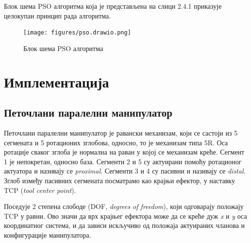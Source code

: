 \documentclass[12pt]{article}
\begin{document}
Блок шема PSO алгоритма која је представљена на слици 2.4.1 приказује целокупан принцип рада алгоритма.

\begin{figure}[H]
    \centering
    \texttt{[image: figures/pso.drawio.png]}
    \caption{Блок шема PSO алгоритма}
    \label{fig:PSO_алгоритам}
\end{figure}
\newpage

\section{Имплементација}

\subsection{Петочлани паралелни манипулатор}
Петочлани паралелни манипулатор је равански механизам, који се састоји из 5 сегмената и 5 ротационих зглобова, односно, то је механизам типа 5R. Оса ротације сваког зглоба је нормална на раван у којој се механизам креће. Сегмент 1 је непокретан, односно база. Сегменти 2 и 5 су актуирани помоћу ротационог актуатора и називају се \textit{proximal}. Сегменти 3 и 4 су пасивни и називају се \textit{distal}. Зглоб између пасивних сегмената посматрамо као крајњи ефектор, у наставку TCP (\textit{tool center point}).

 Поседује 2 степена слободе (DOF, \textit{degrees of freedom}), који одговарају положају TCP у равни. Ово значи да врх крајњег ефектора може да се креће дуж \textit{x} и \textit{y} оса координатног система, и да зависи искључиво од положаја актуираних чланова и конфигурације манипулатора.
\end{document}

